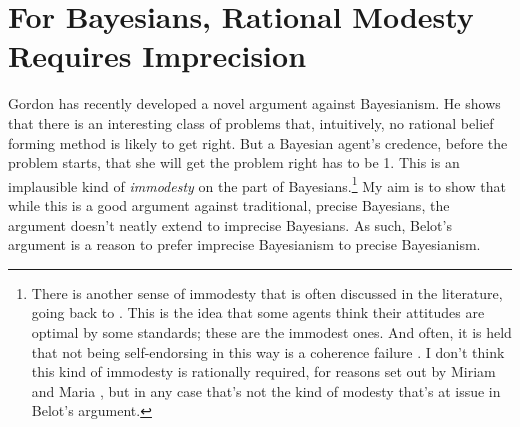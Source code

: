 \newcommand{\vx}{\boldsymbol{x}}
\newcommand{\vX}{\boldsymbol{X}}
\newcommand{\vs}{\boldsymbol{s}}
\newcommand{\vy}{\boldsymbol{y}}
\newcommand{\vz}{\boldsymbol{z}}


\chapter{For Bayesians, Rational Modesty Requires Imprecision}


\noindent Gordon \citet{Belot2013} has recently developed a novel argument against Bay\-es\-ianism. He shows that there is an interesting class of problems that, intuitively, no rational belief forming method is likely to get right. But a Bayesian agent's credence, before the problem starts, that she will get the problem right has to be 1. This is an implausible kind of \textit{immodesty} on the part of Bayesians.\footnote{There is another sense of immodesty that is often discussed in the literature, going back to \citet{Lewis1971d}. This is the idea that some agents think their attitudes are optimal by some standards; these are the immodest ones. And often, it is held that not being self-endorsing in this way is a coherence failure \citet{Elga2010-ELGHTD}. I don't think this kind of immodesty is rationally required, for reasons set out by Miriam \citet{Schoenfield2014} and Maria \citet{Lasonen-Aarnio2015}, but in any case that's not the kind of modesty that's at issue in Belot's argument.} My aim is to show that while this is a good argument against traditional, precise Bayesians, the argument doesn't neatly extend to imprecise Bayesians. As such, Belot's argument is a reason to prefer imprecise Bayesianism to precise Bayesianism.

